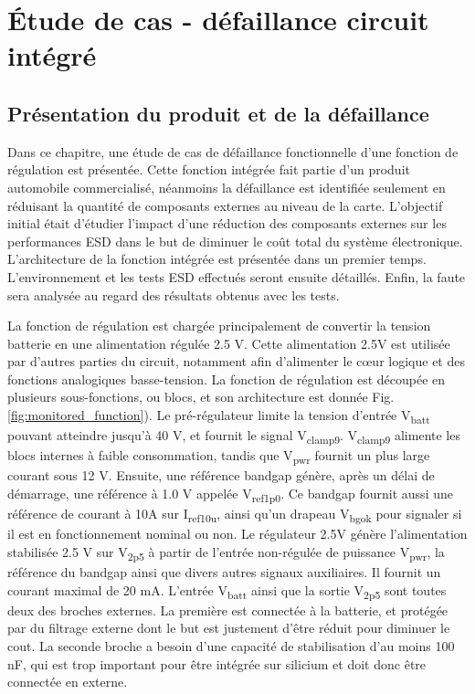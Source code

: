 \chapter{Étude de cas - défaillance circuit intégré}
\label{chap:3}
\section{Présentation du produit et de la défaillance}

Dans ce chapitre, une étude de cas de défaillance fonctionnelle d'une fonction de régulation est présentée.
Cette fonction intégrée fait partie d'un produit automobile commercialisé, néanmoins la défaillance est identifiée seulement en réduisant la quantité de composants externes au niveau de la carte.
L'objectif initial était d'étudier l'impact d'une réduction des composants externes sur les performances ESD dans le but de diminuer le coût total du système électronique.
L'architecture de la fonction intégrée est présentée dans un premier temps.
L'environnement et les tests ESD effectués seront ensuite détaillés.
Enfin, la faute sera analysée au regard des résultats obtenus avec les tests.

La fonction de régulation est chargée principalement de convertir la tension batterie en une alimentation régulée 2.5 V.
Cette alimentation 2.5V est utilisée par d'autres parties du circuit, notamment afin d'alimenter le cœur logique et des fonctions analogiques basse-tension.
La fonction de régulation est découpée en plusieurs sous-fonctions, ou blocs, et son architecture est donnée Fig. \ref{fig:monitored_function}).
Le pré-régulateur limite la tension d'entrée V\textsubscript{batt} pouvant atteindre jusqu'à 40 V, et fournit le signal V\textsubscript{clamp9}.
V\textsubscript{clamp9} alimente les blocs internes à faible consommation, tandis que V\textsubscript{pwr} fournit un plus large courant sous 12 V.
Ensuite, une référence bandgap génère, après un délai de démarrage, une référence à 1.0 V appelée V\textsubscript{ref1p0}.
Ce bandgap fournit aussi une référence de courant à 10\textMu{}A sur I\textsubscript{ref10u}, ainsi qu'un drapeau V\textsubscript{bgok} pour signaler si il est en fonctionnement nominal ou non.
Le régulateur 2.5V génère l'alimentation stabilisée 2.5 V sur V\textsubscript{2p5} à partir de l'entrée non-régulée de puissance V\textsubscript{pwr}, la référence du bandgap ainsi que divers autres signaux auxiliaires.
Il fournit un courant maximal de 20 mA.
L'entrée V\textsubscript{batt} ainsi que la sortie V\textsubscript{2p5} sont toutes deux des broches externes.
La première est connectée à la batterie, et protégée par du filtrage externe dont le but est justement d'être réduit pour diminuer le cout.
La seconde broche a besoin d'une capacité de stabilisation d'au moins 100 nF, qui est trop important pour être intégrée sur silicium et doit donc être connectée en externe.

